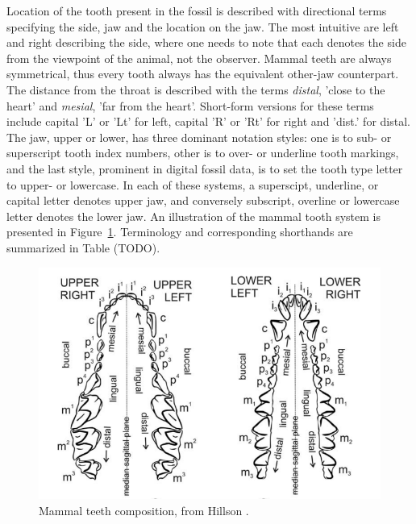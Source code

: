 \documentclass{article}
\begin{document}
Location of the tooth present in the fossil is described with directional terms specifying the side, jaw and the location on the jaw.
The most
intuitive are left and right describing the side, where one needs to note that each denotes the side from the viewpoint of the 
animal, not the observer. Mammal teeth are always symmetrical, thus every tooth always has the 
equivalent other-jaw counterpart. The distance from the throat 
is described with the terms \textit{distal}, 'close to the heart' and \textit{mesial}, 'far from the heart'.
Short-form versions for these terms include capital 'L' or 'Lt' for left, capital 'R' or 'Rt' for right and 'dist.' 
for distal.
The jaw, upper or lower, has three dominant notation styles: one is to sub- or superscript tooth index numbers, other is to 
over- or underline tooth markings, and the last style, prominent in digital fossil data, is to set the tooth type letter to upper- or lowercase.
In each of these systems, a superscipt, underline, or capital letter denotes upper jaw, and conversely subscript, overline or lowercase letter denotes the lower jaw.
An illustration of the mammal tooth system is presented in Figure~\ref{image:mammal_teeth}. Terminology and corresponding shorthands are summarized in Table (TODO).


\begin{figure}[h]
    \centering
    \includegraphics*[scale=0.43]{../images/teeth_img_hillson_book.png}
    \caption{Mammal teeth composition, from Hillson \cite{Hillson_2005}.}
    \label{image:mammal_teeth}
\end{figure}
\end{document}

